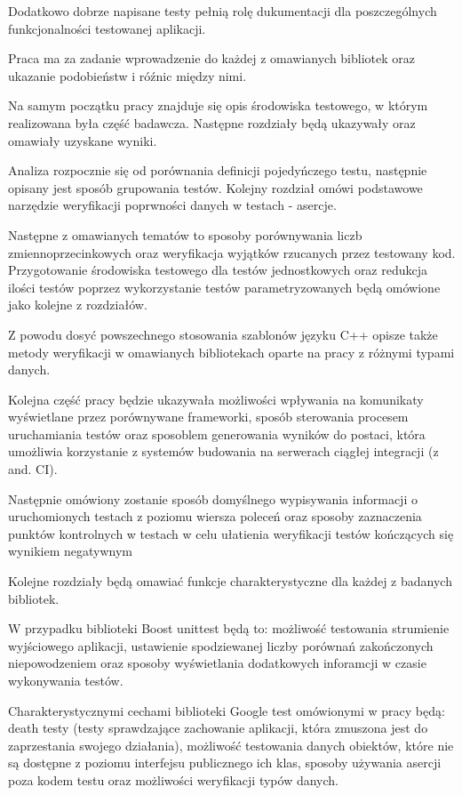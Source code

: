 \documentclass[12pt,a4paper,notitlepage]{report}
\begin{document}
Dodatkowo dobrze napisane testy pełnią rolę dukumentacji dla poszczególnych funkcjonalności testowanej aplikacji.

Praca ma za zadanie wprowadzenie do każdej z omawianych bibliotek oraz ukazanie podobieństw i róźnic między nimi.

Na samym początku pracy znajduje się opis środowiska testowego, w którym realizowana była część badawcza. Następne rozdziały będą ukazywały oraz omawiały uzyskane wyniki.

Analiza rozpocznie się od porównania definicji pojedyńczego testu, następnie opisany jest sposób grupowania testów. Kolejny rozdział omówi podstawowe narzędzie weryfikacji poprwności danych w testach - asercje.

Następne z omawianych tematów to sposoby porównywania liczb zmiennoprzecinkowych oraz weryfikacja wyjątków rzucanych przez testowany kod. Przygotowanie środowiska testowego dla testów jednostkowych oraz redukcja ilości testów poprzez wykorzystanie testów parametryzowanych będą omówione jako kolejne z rozdziałów.

Z powodu dosyć powszechnego stosowania szablonów języku C++ opisze także metody weryfikacji w omawianych bibliotekach oparte na pracy z różnymi typami danych.

Kolejna część pracy będzie ukazywała możliwości wpływania na komunikaty wyświetlane przez porównywane frameworki, sposób sterowania procesem uruchamiania testów oraz sposoblem generowania wyników do postaci, która umożliwia korzystanie z systemów budowania na serwerach ciągłej integracji (z and. CI).

Następnie omówiony zostanie sposób domyślnego wypisywania informacji o uruchomionych testach z poziomu wiersza poleceń oraz sposoby zaznaczenia punktów kontrolnych w testach w celu ułatienia weryfikacji testów kończących się wynikiem negatywnym

Kolejne rozdziały będą omawiać funkcje charakterystyczne dla każdej z badanych bibliotek.

W przypadku biblioteki Boost unittest będą to: możliwość testowania strumienie wyjściowego aplikacji, ustawienie spodziewanej liczby porównań zakończonych niepowodzeniem oraz sposoby wyświetlania dodatkowych inforamcji w czasie wykonywania testów.

Charakterystycznymi cechami biblioteki Google test omówionymi w pracy będą: death testy (testy sprawdzające zachowanie aplikacji, która zmuszona jest do zaprzestania swojego działania), możliwość testowania danych obiektów, które nie są dostępne z poziomu interfejsu publicznego ich klas, sposoby używania asercji poza kodem testu oraz możliwości weryfikacji typów danych.
\end{document}
